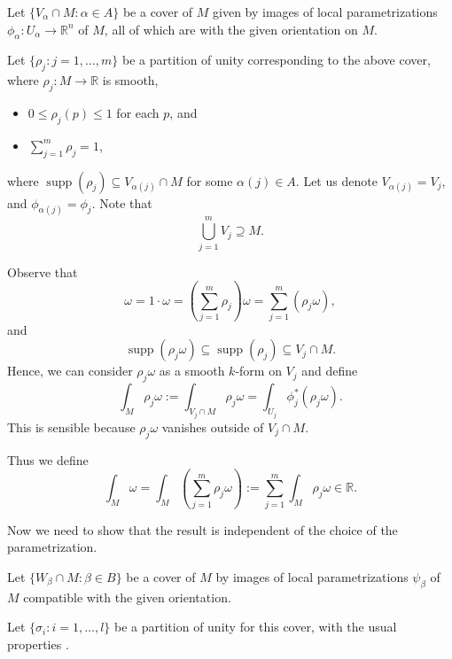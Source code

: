 \documentclass[notoc,notitlepage]{tufte-book}
\DeclareMathOperator{\supp}{supp}
\begin{document}
Let $\{ V_\alpha \cap M : \alpha \in A \}$ be a cover of $M$ given by images of
local parametrizations $\phi_\alpha : U_\alpha \to \mathbb{R}^n$ of $M$, all of
which are  with the given orientation on $M$.

Let $\{ \rho_j : j = 1, \ldots, m \}$ be a partition of unity corresponding to
the above cover, where $\rho_j : M \to \mathbb{R}$ is smooth,
\begin{itemize}
  \item $0 \leq \rho_j(p) \leq 1$ for each $p$, and
  \item $\sum_{j=1}^{m} \rho_j = 1$,
\end{itemize}
where $\supp(\rho_j) \subseteq V_{\alpha(j)} \cap M$ for some $\alpha(j) \in A$.
Let us denote $V_{\alpha(j)} = V_j$, and $\phi_{\alpha(j)} = \phi_j$. Note that
\begin{equation*}
  \bigcup_{j=1}^{m} V_j \supseteq M.
\end{equation*}

Observe that
\begin{equation*}
  \omega = 1 \cdot \omega = \left( \sum_{j=1}^{m} \rho_j \right) \omega =
  \sum_{j=1}^{m} (\rho_j \omega),
\end{equation*}
and
\begin{equation*}
  \supp(\rho_j \omega) \subseteq \supp(\rho_j) \subseteq V_j \cap M.
\end{equation*}
Hence, we can consider $\rho_j \omega$ as a smooth $k$-form on $V_j$ and define
\begin{equation*}
  \int_{M} \rho_j \omega := \int_{V_j \cap M} \rho_j \omega = \int_{U_j}
  \phi_j^* (\rho_j \omega).
\end{equation*}
This is sensible because $\rho_j \omega$ vanishes outside of $V_j \cap M$.

Thus we define
\begin{equation*}
  \int_{M} \omega = \int_{M} \left( \sum_{j=1}^{m} \rho_j \omega \right) :=
  \sum_{j=1}^{m} \int_{M} \rho_j \omega \in \mathbb{R}. 
\end{equation*}

Now we need to show that the result is independent of the choice of the
parametrization.

Let $\{ W_\beta \cap M : \beta \in B \}$ be a cover of $M$ by images of local
parametrizations $\psi_\beta$ of $M$ compatible with the given orientation.

Let $\{ \sigma_i : i = 1, \ldots, l \}$ be a partition of unity for this cover,
with the usual properties .
\end{document}
